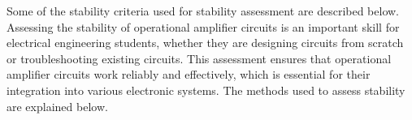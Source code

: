 \begin{frame}
{%
    

    Some of the stability criteria used for stability assessment are described below.
    Assessing the stability of operational amplifier circuits is an important skill for electrical engineering students, whether they are designing circuits from scratch or troubleshooting existing circuits. 
    This assessment ensures that operational amplifier circuits work reliably and effectively, which is essential for their integration into various electronic systems. The methods used to assess stability are explained below.

}
\end{frame}
